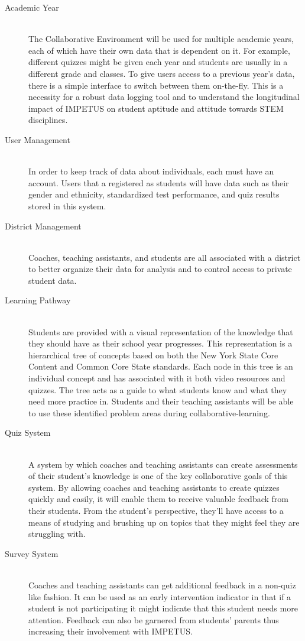 \begin{description}
	\item [Academic Year] \hfill \\ The Collaborative Environment will be used for multiple academic years, each of which have their own data that is dependent on it. For example, different quizzes might be given each year and students are usually in a different grade and classes. To give users access to a previous year's data, there is a simple interface to switch between them on-the-fly. This is a necessity for a robust data logging tool and to understand the longitudinal impact of IMPETUS on student aptitude and attitude towards STEM disciplines.
	\item [User Management] \hfill \\ In order to keep track of data about individuals, each must have an account. Users that a registered as students will have data such as their gender and ethnicity, standardized test performance, and quiz results stored in this system.
	\item [District Management] \hfill \\ Coaches, teaching assistants, and students are all associated with a district to better organize their data for analysis and to control access to private student data.
	\item [Learning Pathway] \hfill \\ Students are provided with a visual representation of the knowledge that they should have as their school year progresses. This representation is a hierarchical tree of concepts based on both the New York State Core Content and Common Core State standards. Each node in this tree is an individual concept and has associated with it both video resources and quizzes. The tree acts as a guide to what students know and what they need more practice in. Students and their teaching assistants will be able to use these identified problem areas during collaborative-learning.
	\item [Quiz System] \hfill \\ A system by which coaches and teaching assistants can create assessments of their student's knowledge is one of the key collaborative goals of this system. By allowing coaches and teaching assistants to create quizzes quickly and easily, it will enable them to receive valuable feedback from their students. From the student's perspective, they'll have access to a means of studying and brushing up on topics that they might feel they are struggling with.
	\item [Survey System] \hfill \\ Coaches and teaching assistants can get additional feedback in a non-quiz like fashion. It can be used as an early intervention indicator in that if a student is not participating it might indicate that this student needs more attention. Feedback can also be garnered from students' parents thus increasing their involvement with IMPETUS.

\end{description}
